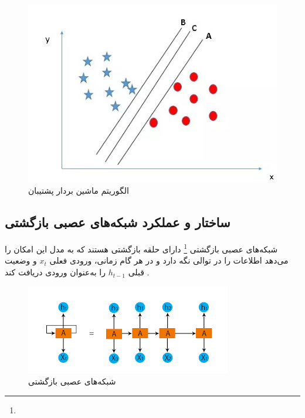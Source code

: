 \begin{figure}[h]
	\centering
	\begin{minipage}[b]{0.8\textwidth}
		\centering
		\includegraphics[width=\textwidth]{transformer_images/SVM_11zon.jpg}
		\caption{الگوریتم ماشین بردار پشتیبان}
		\label{fig:support vector machine}
	\end{minipage}
	\hfill
\end{figure}


\subsection{ساختار و عملکرد شبکه‌های عصبی بازگشتی}
شبکه‌های عصبی بازگشتی \footnote{} دارای حلقه بازگشتی هستند که به مدل این امکان را می‌دهد اطلاعات را در توالی نگه دارد و در هر گام زمانی، ورودی فعلی \( x_t \) و وضعیت قبلی \( h_{t-1} \) را به‌عنوان ورودی دریافت کند \cite{goodfellow2016deep}.  

\begin{figure}[h]
	\centering
	\begin{minipage}[b]{0.7\textwidth}
		\centering
		\includegraphics[width=\textwidth]{transformer_images/rnn_image.png}
		\caption{شبکه‌های عصبی بازگشتی}
		\label{fig:recurrent neural network}
	\end{minipage}
	\hfill
\end{figure}

